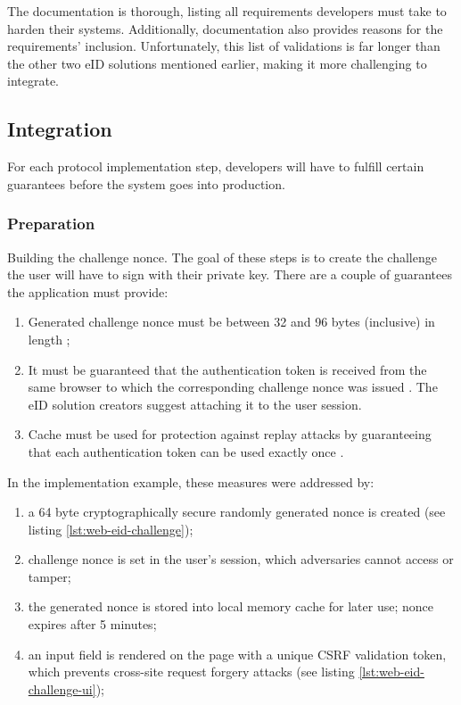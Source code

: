 The documentation is thorough, listing all requirements developers must take to harden their systems. Additionally, documentation also provides reasons for the requirements' inclusion. Unfortunately, this list of validations is far longer than the other two eID solutions mentioned earlier, making it more challenging to integrate.

\subsection{Integration}

For each protocol implementation step, developers will have to fulfill certain guarantees before the system goes into production.

\subsubsection{Preparation}

Building the challenge nonce. The goal of these steps is to create the challenge the user will have to sign with their private key. There are a couple of guarantees the application must provide:
\begin{enumerate}
  \item Generated challenge nonce must be between 32 and 96 bytes (inclusive) in length \cite{ria-webeid-source-web-eid-app-authenticate};
  \item It must be guaranteed that the authentication token is received from the same browser to which the corresponding challenge nonce was issued \cite{ria-webeid-source-web-eid-authtoken-validation-java-readme}. The eID solution creators suggest attaching it to the user session.
  \item Cache must be used for protection against replay attacks by guaranteeing that each authentication token can be used exactly once \cite{ria-webeid-source-web-eid-authtoken-validation-java-readme}.
\end{enumerate}

In the implementation example, these measures were addressed by:
\begin{enumerate}
  \item a 64 byte cryptographically secure randomly generated nonce is created (see listing \ref{lst:web-eid-challenge});
  \item challenge nonce is set in the user's session, which adversaries cannot access or tamper;
  \item the generated nonce is stored into local memory cache for later use; nonce expires after 5 minutes;
  \item an input field is rendered on the page with a unique CSRF validation token, which prevents cross-site request forgery attacks (see listing \ref{lst:web-eid-challenge-ui});
\end{enumerate}

